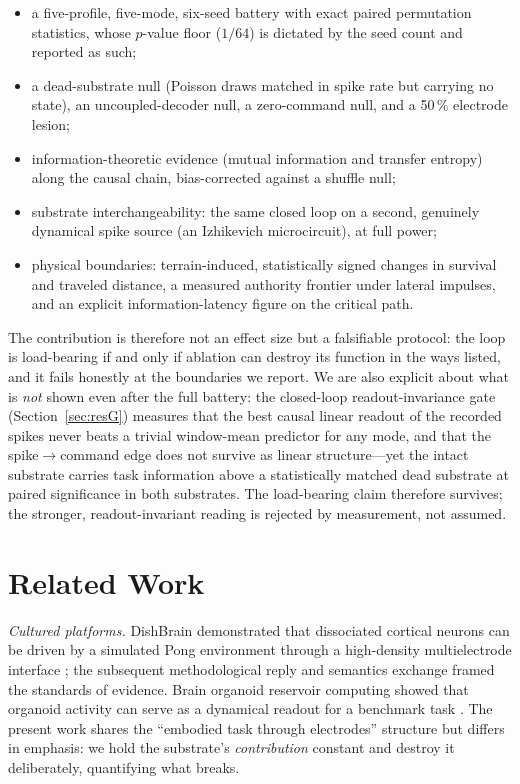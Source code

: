 \begin{itemize}
\item a five-profile, five-mode, six-seed battery with exact paired permutation
      statistics, whose $p$-value floor ($1/64$) is dictated by the seed count
      and reported as such;
\item a dead-substrate null (Poisson draws matched in spike rate but carrying
      no state), an uncoupled-decoder null, a zero-command null, and a
      50\,\% electrode lesion;
\item information-theoretic evidence (mutual information and transfer entropy)
      along the causal chain, bias-corrected against a shuffle null;
\item substrate interchangeability: the same closed loop on a second, genuinely
      dynamical spike source (an Izhikevich microcircuit), at full power;
\item physical boundaries: terrain-induced, statistically signed changes in
      survival and traveled distance, a measured authority frontier under
      lateral impulses, and an explicit information-latency figure on the
      critical path.
\end{itemize}

The contribution is therefore not an effect size but a falsifiable protocol:
the loop is load-bearing if and only if ablation can destroy its function in
the ways listed, and it fails honestly at the boundaries we report. We are
also explicit about what is \emph{not} shown even after the full battery: the
closed-loop readout-invariance gate (Section~\ref{sec:resG}) measures that the
best causal linear readout of the recorded spikes never beats a trivial
window-mean predictor for any mode, and that the spike$\rightarrow$command edge
does not survive as linear structure---yet the intact substrate carries task
information above a statistically matched dead substrate at paired significance
in both substrates. The load-bearing claim therefore survives; the stronger,
readout-invariant reading is rejected by measurement, not assumed.

\section{Related Work}

\emph{Cultured platforms.} DishBrain demonstrated that dissociated cortical
neurons can be driven by a simulated Pong environment through a high-density
multielectrode interface \cite{kagan2022dishbrain}; the subsequent
methodological reply \cite{balci2023neurons} and semantics exchange
\cite{kagan2023semantics} framed the standards of evidence. Brain organoid
reservoir computing showed that organoid activity can serve as a dynamical
readout for a benchmark task \cite{cai2023brainoware}. The present work shares
the ``embodied task through electrodes'' structure but differs in emphasis: we
hold the substrate's \emph{contribution} constant and destroy it deliberately,
quantifying what breaks.

